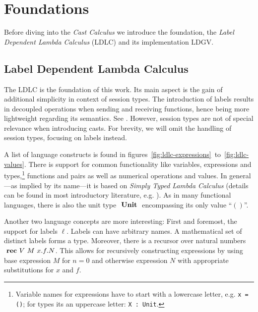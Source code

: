 \chapter{Foundations}\label{chap:foundations}

Before diving into the \emph{Cast Calculus} we introduce the foundation, the \emph{Label Dependent Lambda Calculus} (LDLC) and its implementation LDGV.

\section{Label Dependent Lambda Calculus}\label{sec:ldlc}

The LDLC is the foundation of this work. Its main aspect is the gain of additional simplicity in context of session types. The introduction of labels results in decoupled operations when sending and receiving functions, hence being more lightweight regarding its semantics. See \cite{thiemann2019}. However, session types are not of special relevance when introducing casts. For brevity, we will omit the handling of session types, focusing on labels instead.

A list of language constructs is found in figures~\ref{fig:ldlc-expressions}~to~\ref{fig:ldlc-values}. There is support for common functionality like variables, expressions and types,\footnote{
Variable names for expressions have to start with a lowercase letter, e.g. \texttt{\valb x = ()}; for types its an uppercase letter: \texttt{\typeb X : Unit}.} functions and pairs as well as numerical operations and values. In general---as implied by its name---it is based on \emph{Simply Typed Lambda Calculus} (details can be found in most introductory literature, e.g. \cite{pierce2002}). As in many functional languages, there is also the unit type $\text{ \textbf{Unit} }$ encompassing its only value ``$()$''. 

Another two language concepts are more interesting: First and foremost, the support for labels $\ell$. Labels can have arbitrary names. A mathematical set of distinct labels forms a type. Moreover, there is a recursor over natural numbers $\text{ \textbf{rec} } V~M~x.f.N$. This allows for recursively constructing expressions by using base expression $M$ for $n=0$ and otherwise expression $N$ with appropriate substitutions for $x$ and $f$.

